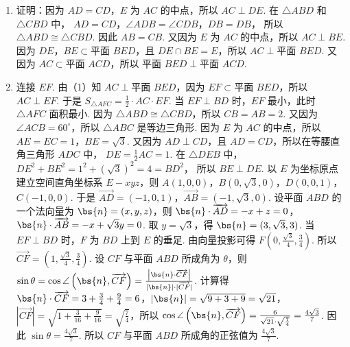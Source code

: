 \begin{solution}
\begin{enumerate}
\item 证明：因为 \(AD=CD\)，\(E\) 为 \(AC\) 的中点，所以
\(AC\perp DE\).
在 \(\triangle ABD\) 和 \(\triangle CBD\) 中，
\(AD=CD\)，\(\angle ADB=\angle CDB\)，\(DB=DB\)，
所以
\(\triangle ABD\cong \triangle CBD\).
因此
\(AB=CB\).
又因为 \(E\) 为 \(AC\) 的中点，所以
\(AC\perp BE\).
因为 \(DE\)，\(BE\subset \text{平面 }BED\)，且 \(DE\cap BE=E\)，所以
\(AC\perp \text{平面 }BED\).
又因为 \(AC\subset \text{平面 }ACD\)，所以
\(\text{平面 }BED\perp \text{平面 }ACD\).

\item 连接 \(EF\). 由（1）知 \(AC\perp \text{平面 }BED\)，因为 \(EF\subset \text{平面 }BED\)，所以
\(AC\perp EF\).
于是
\(S_{\triangle AFC}=\frac{1}{2}\cdot AC\cdot EF\).
当 \(EF\perp BD\) 时，\(EF\) 最小，此时 \(\triangle AFC\) 面积最小.
因为 \(\triangle ABD\cong \triangle CBD\)，所以
\(CB=AB=2\).
又因为 \(\angle ACB=60^\circ\)，所以 \(\triangle ABC\) 是等边三角形.
因为 \(E\) 为 \(AC\) 的中点，所以
\(AE=EC=1\)，\(BE=\sqrt{3}\).
又因为 \(AD\perp CD\)，且 \(AD=CD\)，所以在等腰直角三角形 \(ADC\) 中，
\(DE=\frac{1}{2}AC=1\).
在 \(\triangle DEB\) 中，
\(DE^2+BE^2=1^2+\left( \sqrt{3} \right)^2=4=BD^2\)，
所以
\(BE\perp DE\).
以 \(E\) 为坐标原点建立空间直角坐标系 \(E-xyz\)，则
\(A(1,0,0)\)，\(B(0,\sqrt{3},0)\)，\(D(0,0,1)\)，\(C(-1,0,0)\).
于是
\(\overrightarrow{AD}=(-1,0,1)\)，\(\overrightarrow{AB}=(-1,\sqrt{3},0)\).
设平面 \(ABD\) 的一个法向量为 \(\bs{n}=(x,y,z)\)，则
\(\bs{n}\cdot \overrightarrow{AD}=-x+z=0\)，\(\bs{n}\cdot \overrightarrow{AB}=-x+\sqrt{3}y=0\).
取 \(y=\sqrt{3}\)，得
\(\bs{n}=(3,\sqrt{3},3)\).
当 \(EF\perp BD\) 时，\(F\) 为 \(BD\) 上到 \(E\) 的垂足. 由向量投影可得
\(F\left( 0,\frac{\sqrt{3}}{4},\frac{3}{4} \right)\).
所以
\(\overrightarrow{CF}=\left( 1,\frac{\sqrt{3}}{4},\frac{3}{4} \right)\).
设 \(CF\) 与平面 \(ABD\) 所成角为 \(\theta\)，则 \(\sin \theta=\cos \angle \left( \bs{n},\overrightarrow{CF} \right)=\frac{\left| \bs{n}\cdot \overrightarrow{CF} \right|}{|\bs{n}|\cdot |\overrightarrow{CF}|}\).
计算得 \(\bs{n}\cdot \overrightarrow{CF} =3+\frac{3}{4}+\frac{9}{4} =6\)，\(|\bs{n}|=\sqrt{9+3+9}=\sqrt{21}\)，\(|\overrightarrow{CF}|=\sqrt{1+\frac{3}{16}+\frac{9}{16}}=\sqrt{\frac{7}{4}}\)，所以 \(\cos \angle \left( \bs{n},\overrightarrow{CF} \right)=\frac{6}{\sqrt{21}\cdot \sqrt{\frac{7}{4}}}=\frac{4\sqrt{3}}{7}\).
因此
\(\sin \theta=\frac{4\sqrt{3}}{7}\).
所以 \(CF\) 与平面 \(ABD\) 所成角的正弦值为
\(\frac{4\sqrt{3}}{7}\).
\end{enumerate}
\end{solution}

